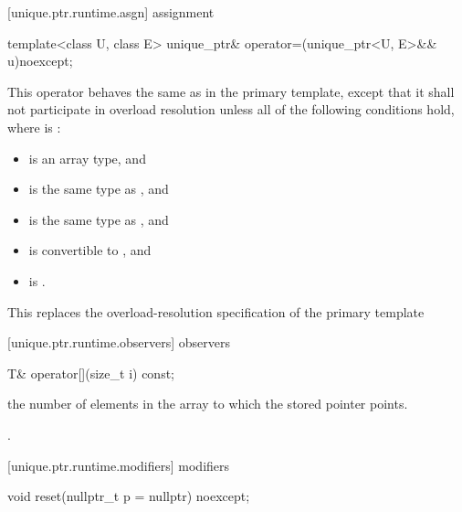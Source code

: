 [unique.ptr.runtime.asgn]{ assignment}

%
\begin{itemdecl}
template<class U, class E> unique_ptr& operator=(unique_ptr<U, E>&& u)noexcept;
\end{itemdecl}

\begin{itemdescr}
\pnum
This operator behaves the same as in the primary template,
except that it shall not participate in overload resolution
unless all of the following conditions hold,
where  is :

\begin{itemize}
\item {} is an array type, and
\item {} is the same type as , and
\item {} is the same type as , and
\item {} is convertible to , and
\item {} is .
\end{itemize}

\begin{note}
This replaces the overload-resolution specification of the primary template
\end{note}
\end{itemdescr}

[unique.ptr.runtime.observers]{ observers}

%
\begin{itemdecl}
T& operator[](size_t i) const;
\end{itemdecl}

\begin{itemdescr}
\pnum
\requires {} the
number of elements in the array to which
the stored pointer points.

\pnum
\returns {}.
\end{itemdescr}

[unique.ptr.runtime.modifiers]{ modifiers}

%
\begin{itemdecl}
void reset(nullptr_t p = nullptr) noexcept;
\end{itemdecl}

